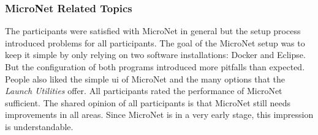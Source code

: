 \subsubsection{MicroNet Related Topics}

The participants were satisfied with MicroNet in general but the setup process
introduced problems for all participants. The goal of the MicroNet setup was to
keep it simple by only relying on two software installations: Docker and
Eclipse. But the configuration of both programs introduced more pitfalls than
expected. People also liked the simple \gls{ui} of MicroNet and the many options
that the \textit{Launch Utilities} offer. All participants rated the performance
of MicroNet sufficient. The shared opinion of all participants is that MicroNet
still needs improvements in all areas. Since MicroNet is in a very early stage,
this impression is understandable.


